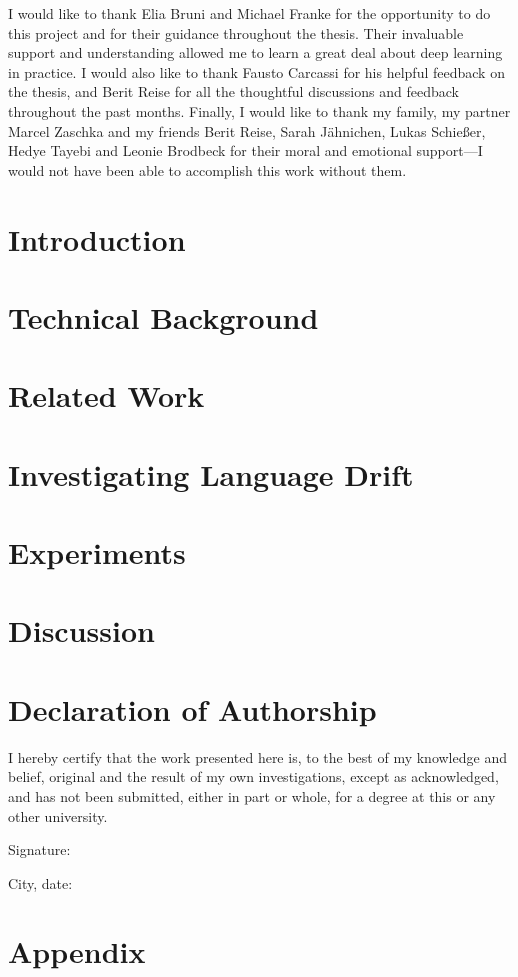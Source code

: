 \documentclass[11pt, twoside, openright]{report} %
\begin{document}
	I would like to thank Elia Bruni and Michael Franke for the opportunity to do this project and for their guidance throughout the thesis. Their invaluable support and understanding allowed me to learn a great deal about deep learning in practice. I would also like to thank Fausto Carcassi for his helpful feedback on the thesis, and Berit Reise for all the thoughtful discussions and feedback throughout the past months.
	Finally, I would like to thank my family, my partner Marcel Zaschka and my friends Berit Reise, Sarah J\"ahnichen, Lukas Schießer, Hedye Tayebi and Leonie Brodbeck for their moral and emotional support---I would not have been able to accomplish this work without them.
	
	\tableofcontents
	
	\chapter{Introduction}
	\label{chapter01}
	
	
	\chapter{Technical Background}
	\label{chapter02}
	
	
	\chapter{Related Work}
	\label{chapter03}
	
	
	\chapter{Investigating Language Drift}
	\label{chapter04}
	
	
	\chapter{Experiments}
	\label{chapter05}
	
	
	\chapter{Discussion}
	\label{chapter06}
	
	
	\chapter*{Declaration of Authorship}
	I hereby certify that the work presented here is, to the best of my knowledge and belief, original and the result of my own investigations, except as acknowledged, and has not been submitted, either in part or whole, for a degree at this or any other university.
	
	\vspace{2cm}
	Signature:~\makebox[3in]{\hrulefill}
	
	\vspace{1cm}
	City, date:~\makebox[3in]{\hrulefill} 
	
	\appendix
	\chapter{Appendix}	
	\label{appendix}
	
	
	\printbibliography
\end{document}
